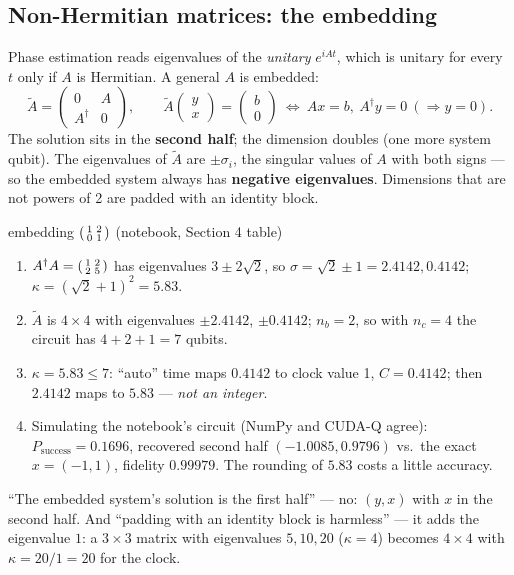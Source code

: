 \documentclass[11pt,a4paper,openany]{book}
\newcounter{wex}[chapter]
\newenvironment{steps}{\begin{enumerate}[label=\textbf{Step \arabic*.}, leftmargin=4.2em, itemsep=2pt]}{\end{enumerate}}
\begin{document}
\subsection{Non-Hermitian matrices: the embedding}
Phase estimation reads eigenvalues of the \emph{unitary} $e^{iAt}$, which is unitary for every $t$ only if $A$ is Hermitian. A general $A$ is embedded:
\[ \tilde A = \begin{pmatrix}0 & A\\ A^\dagger & 0\end{pmatrix},\qquad \tilde A\begin{pmatrix}y\\ x\end{pmatrix} = \begin{pmatrix}b\\ 0\end{pmatrix}
\ \Longleftrightarrow\ Ax = b,\ A^\dagger y = 0\ (\Rightarrow y = 0). \]
The solution sits in the \textbf{second half}; the dimension doubles (one more system qubit). The eigenvalues of $\tilde A$ are $\pm\sigma_i$, the singular values
of $A$ with both signs --- so the embedded system always has \textbf{negative eigenvalues}. Dimensions that are not powers of 2 are padded with an identity block.
\begin{wexample}{embedding $\begin{psmallmatrix}1&2\\0&1\end{psmallmatrix}$ (notebook, Section 4 table)}
\begin{steps}
\item $A^\dagger A = \begin{psmallmatrix}1&2\\2&5\end{psmallmatrix}$ has eigenvalues $3 \pm 2\sqrt2$, so $\sigma = \sqrt2 \pm 1 = 2.4142, 0.4142$; $\kappa = (\sqrt2 + 1)^2 = 5.83$.
\item $\tilde A$ is $4\times4$ with eigenvalues $\pm2.4142$, $\pm0.4142$; $n_b = 2$, so with $n_c = 4$ the circuit has $4 + 2 + 1 = 7$ qubits.
\item $\kappa = 5.83 \le 7$: ``auto'' time maps $0.4142$ to clock value 1, $C = 0.4142$; then $2.4142$ maps to $5.83$ --- \emph{not an integer}.
\item Simulating the notebook's circuit (NumPy and CUDA-Q agree): $P_{\text{success}} = 0.1696$, recovered second half $(-1.0085, 0.9796)$ vs.\ the exact
      $x = (-1, 1)$, fidelity $0.99979$. The rounding of $5.83$ costs a little accuracy.
\end{steps}
\end{wexample}
\begin{trap}
``The embedded system's solution is the first half'' --- no: $(y, x)$ with $x$ in the second half. And ``padding with an identity block is harmless'' --- it adds
the eigenvalue $1$: a $3\times3$ matrix with eigenvalues $5, 10, 20$ ($\kappa = 4$) becomes $4\times4$ with $\kappa = 20/1 = 20$ for the clock.
\end{trap}
\end{document}
